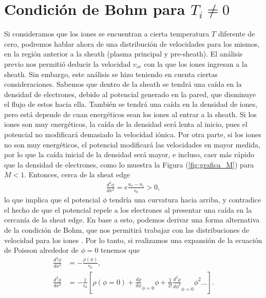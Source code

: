 \documentclass[../main.tex]{subfiles}
\begin{document}
{\begin{figure}[h]
        \label{fig:potencial_dens_sheath_presheath}
        \end{figure}
	\section{Condición de Bohm para $T_i \neq 0$}
    Si consideramos que los iones se encuentran a cierta temperatura $T$ diferente de cero, podremos hablar ahora de una distribución de velocidades para los mismos, en la región anterior a la sheath (plasma principal y pre-sheath). El análisis previo nos permitió deducir la velocidad $v_{se}$ con la que los iones ingresan a la sheath. Sin embargo, este análisis se hizo teniendo en cuenta ciertas consideraciones. Sabemos que dentro de la sheath se tendrá una caída en la densidad de electrones, debido al potencial generado en la pared, que disminuye el flujo de estos hacia ella.
    También se tendrá una caída en la densidad de iones, pero está depende de cuan energéticos sean los iones
    al entrar a la sheath. Si los iones son muy energéticos, la caída de la densidad será lenta al inicio, pues el potencial no modificará demasiado la velocidad iónica. Por otra parte, si los iones no son muy energéticos, el potencial modificará las velocidades en mayor medida, por lo que la caída inicial de la densidad será mayor, e incluso, caer más rápido que la densidad de electrones, como lo muestra la Figura (\ref{fig:grafica_M}) para $M<1$. Entonces, cerca de la sheat edge
    \begin{align}
        \frac{d^2\phi}{dx^2} = e \frac{n_e - n_i}{\epsilon_0} > 0,
     \end{align}   
    lo que implica que el potencial $\phi$ tendría una curvatura hacia arriba, y contradice el hecho de que el potencial repele a los electrones al presentar una caída en la cercanía de la sheat edge.  En base a esto, podemos derivar una forma alternativa de la condición de Bohm, que nos permitirá trabajar con las distribuciones de velocidad para los iones \cite{baalrud2011kinetic}. Por lo tanto, si realizamos una expansión de la ecuación de Poisson alrededor de $\phi = 0$ tenemos que 
    \begin{align}
        \frac{d^2\phi}{dx^2} &= -\frac{\rho\left(\phi\right)}{\epsilon_0}, \\
        \frac{d^2\phi}{dx^2} &= -\frac{1}{\epsilon_0}\left[\rho(\phi = 0) + \frac{d\rho}{d\phi}_{\phi = 0} \phi+ \frac{1}{2!}\frac{d^2\rho}{d\phi^2}_{\phi = 0} \phi^2 ...\right].

\end{align}}
\end{document}
